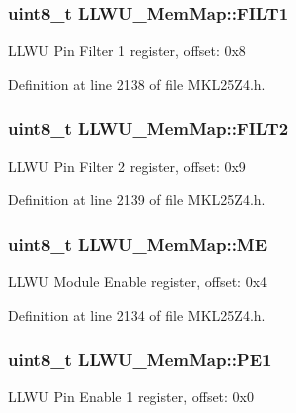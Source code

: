 \subsubsection[{\texorpdfstring{F\+I\+L\+T1}{FILT1}}]{\setlength{\rightskip}{0pt plus 5cm}uint8\+\_\+t L\+L\+W\+U\+\_\+\+Mem\+Map\+::\+F\+I\+L\+T1}\hypertarget{struct_l_l_w_u___mem_map_a80ad19326e9bf7209c71d7955e4ef044}{}\label{struct_l_l_w_u___mem_map_a80ad19326e9bf7209c71d7955e4ef044}
L\+L\+WU Pin Filter 1 register, offset\+: 0x8 

Definition at line 2138 of file M\+K\+L25\+Z4.\+h.

\subsubsection[{\texorpdfstring{F\+I\+L\+T2}{FILT2}}]{\setlength{\rightskip}{0pt plus 5cm}uint8\+\_\+t L\+L\+W\+U\+\_\+\+Mem\+Map\+::\+F\+I\+L\+T2}\hypertarget{struct_l_l_w_u___mem_map_a84fdf2d8e40d91c4ad620512aaca152b}{}\label{struct_l_l_w_u___mem_map_a84fdf2d8e40d91c4ad620512aaca152b}
L\+L\+WU Pin Filter 2 register, offset\+: 0x9 

Definition at line 2139 of file M\+K\+L25\+Z4.\+h.

\subsubsection[{\texorpdfstring{ME}{ME}}]{\setlength{\rightskip}{0pt plus 5cm}uint8\+\_\+t L\+L\+W\+U\+\_\+\+Mem\+Map\+::\+ME}\hypertarget{struct_l_l_w_u___mem_map_ae8dea688fae93c1a5f9dd22b70cdc5cf}{}\label{struct_l_l_w_u___mem_map_ae8dea688fae93c1a5f9dd22b70cdc5cf}
L\+L\+WU Module Enable register, offset\+: 0x4 

Definition at line 2134 of file M\+K\+L25\+Z4.\+h.

\subsubsection[{\texorpdfstring{P\+E1}{PE1}}]{\setlength{\rightskip}{0pt plus 5cm}uint8\+\_\+t L\+L\+W\+U\+\_\+\+Mem\+Map\+::\+P\+E1}\hypertarget{struct_l_l_w_u___mem_map_abb0c4dd1142a84dc991e6dda4a8381d6}{}\label{struct_l_l_w_u___mem_map_abb0c4dd1142a84dc991e6dda4a8381d6}
L\+L\+WU Pin Enable 1 register, offset\+: 0x0 

